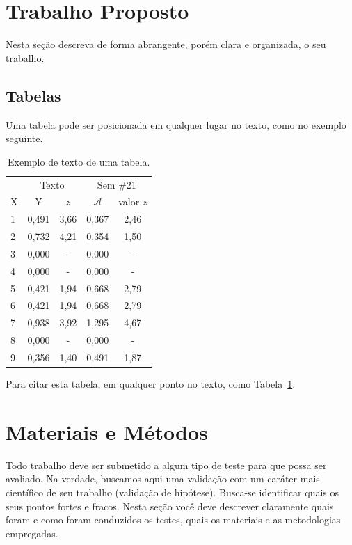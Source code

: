 \documentclass[twoside,conference,a4paper]{IEEEtran}
\begin{document}
	\section{Trabalho Proposto}
	
	Nesta seção descreva de forma abrangente, porém clara e organizada, o seu trabalho.
	
	\subsection{Tabelas}
	
	Uma tabela pode ser posicionada em qualquer lugar no texto, como no exemplo
	seguinte.
	\begin{table}[ht]
		\renewcommand{\arraystretch}{1.3}
		\centering
		\caption{Exemplo de texto de uma tabela.}
		\label{tab:tab1}
		\begin{tabular}{lcccc}\hline
			& \multicolumn{2}{c}{Texto}
			& \multicolumn{2}{c}{Sem \#21} \\ \cline{2-5}
			X & Y & $z$ & $\mathcal{A}$ & valor-$z$ \\ \hline \hline
			1      &0,491  & 3,66   &0,367 &2,46  \\
			2    &0,732  & 4,21   &0,354 &1,50  \\
			3      &0,000  & -      &0,000 & -    \\
			4      &0,000  & -      &0,000 & -  \\
			5      &0,421  & 1,94   &0,668 &2,79  \\
			6      &0,421  & 1,94   &0,668 &2,79  \\
			7      &0,938  & 3,92   &1,295 &4,67 \\
			8       &0,000  & -      &0,000 & - \\
			9       &0,356  & 1,40   &0,491 &1,87 \\ \hline
		\end{tabular}
	\end{table}
	
	Para citar esta tabela, em qualquer ponto no texto, como Tabela~\ref{tab:tab1}.
	
	
	\section{Materiais e Métodos}
	
	Todo trabalho deve ser submetido a algum tipo de teste para que possa ser avaliado. Na verdade, buscamos aqui uma validação com um caráter mais científico de seu trabalho (validação de hipótese). Busca-se identificar quais os seus pontos fortes e fracos. Nesta seção você deve descrever claramente quais foram e como foram conduzidos os testes, quais os materiais e as metodologias empregadas.   
	
\end{document}
